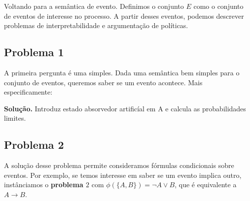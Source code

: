 \documentclass{article}
\begin{document}
Voltando para a semântica de evento. Definimos o conjunto $E$ como o conjunto de eventos de interesse no processo. A partir desses eventos, podemos descrever problemas de interpretabilidade e argumentação de políticas.


\subsection{Problema 1}
A primeira pergunta é uma simples. Dada uma semântica bem simples para o conjunto de eventos, queremos saber se um evento acontece. Mais especificamente:

\begin{center}
\end{center}

\textbf{Solução.} Introduz estado absorvedor artificíal em A e calcula as probabilidades limites.

\subsection{Problema 2}

\begin{center}
\end{center}

A solução desse problema permite consideramos fórmulas condicionais sobre eventos. Por exemplo, se temos interesse em saber se um evento implica outro, instânciamos o \textbf{problema $2$} com $\phi(\{A,B\}) = \neg A \lor B $, que é equivalente a $A \rightarrow B$.
\end{document}
